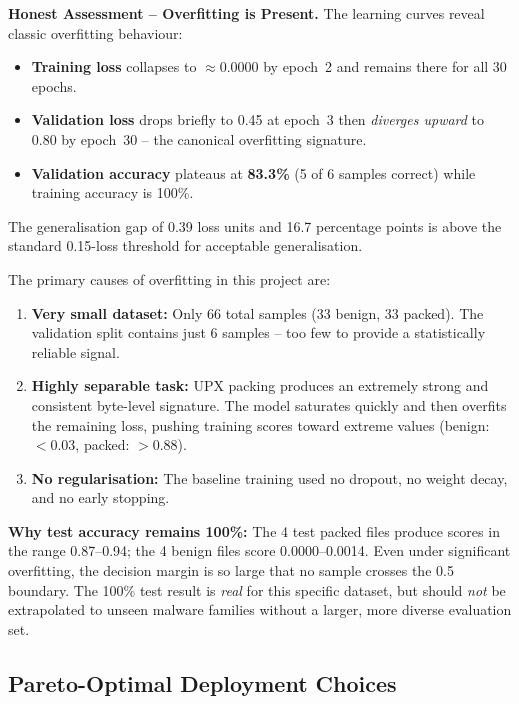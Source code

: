 \documentclass[12pt,a4paper]{article}
\begin{document}
\begin{tcolorbox}[warnbox]
\textbf{Honest Assessment -- Overfitting is Present.}\quad
The learning curves reveal classic overfitting behaviour:
\begin{itemize}
  \item \textbf{Training loss} collapses to $\approx$0.0000 by epoch~2 and
        remains there for all 30 epochs.
  \item \textbf{Validation loss} drops briefly to 0.45 at epoch~3 then
        \textit{diverges upward} to 0.80 by epoch~30 -- the canonical
        overfitting signature.
  \item \textbf{Validation accuracy} plateaus at \textbf{83.3\%} (5 of 6
        samples correct) while training accuracy is 100\%.
\end{itemize}
The generalisation gap of 0.39 loss units and 16.7 percentage points is
above the standard 0.15-loss threshold for acceptable generalisation.
\end{tcolorbox}

\noindent
The primary causes of overfitting in this project are:
\begin{enumerate}
  \item \textbf{Very small dataset:} Only 66 total samples (33 benign, 33 packed).
        The validation split contains just 6 samples -- too few to provide a
        statistically reliable signal.
  \item \textbf{Highly separable task:} UPX packing produces an extremely strong
        and consistent byte-level signature.  The model saturates quickly and
        then overfits the remaining loss, pushing training scores toward extreme
        values (benign: $<$0.03, packed: $>$0.88).
  \item \textbf{No regularisation:} The baseline training used no dropout, no
        weight decay, and no early stopping.
\end{enumerate}

\noindent
\textbf{Why test accuracy remains 100\%:} The 4 test packed files produce
scores in the range 0.87--0.94; the 4 benign files score 0.0000--0.0014.
Even under significant overfitting, the decision margin is so large that no
sample crosses the 0.5 boundary.  The 100\% test result is \textit{real} for
this specific dataset, but should \textit{not} be extrapolated to unseen
malware families without a larger, more diverse evaluation set.

\subsection{Pareto-Optimal Deployment Choices}
\end{document}
